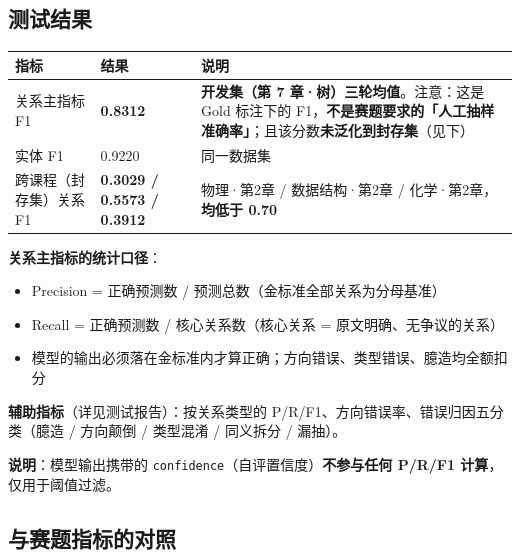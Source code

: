 \documentclass[UTF8,a4paper,11pt]{ctexrep}
\begin{document}
\subsection{测试结果}

\begin{center}
\small
\begin{tabularx}{\linewidth}{@{}XXX@{}}
\toprule
指标 & 结果 & 说明 \\
\midrule
关系主指标 F1 & \textbf{0.8312} & \textbf{开发集（第 7 章·树）三轮均值}。注意：这是 Gold 标注下的 F1，\textbf{不是赛题要求的「人工抽样准确率」}；且该分数\textbf{未泛化到封存集}（见下） \\
实体 F1 & 0.9220 & 同一数据集 \\
跨课程（封存集）关系 F1 & \textbf{0.3029 / 0.5573 / 0.3912} & 物理·第2章 / 数据结构·第2章 / 化学·第2章，\textbf{均低于 0.70} \\
\bottomrule
\end{tabularx}
\end{center}
\textbf{关系主指标的统计口径}：

\begin{itemize}
\item Precision = 正确预测数 / 预测总数（金标准全部关系为分母基准）
\item Recall = 正确预测数 / 核心关系数（核心关系 = 原文明确、无争议的关系）
\item 模型的输出必须落在金标准内才算正确；方向错误、类型错误、臆造均全额扣分
\end{itemize}
\textbf{辅助指标}（详见测试报告）：按关系类型的 P/R/F1、方向错误率、错误归因五分类（臆造 / 方向颠倒 / 类型混淆 / 同义拆分 / 漏抽）。

\begin{notebox}
\textbf{说明}：模型输出携带的 \texttt{confidence}（自评置信度）\textbf{不参与任何 P/R/F1 计算}，仅用于阈值过滤。

\end{notebox}


\subsection{与赛题指标的对照}
\end{document}
